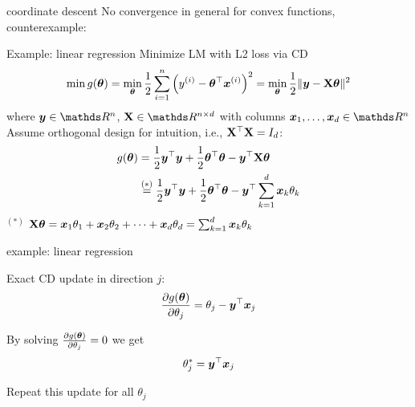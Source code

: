 \documentclass[11pt,compress,t,notes=noshow, xcolor=table]{beamer}
\begin{document}
\begin{framev}{coordinate descent}
No convergence in general for convex functions, counterexample:
\end{framev}


\begin{framev}{Example: linear regression}
Minimize LM with L2 loss via CD
$$\min g(\bm{\theta}) = \min_{\bm{\theta}} \frac{1}{2}\sum\limits_{i=1}^n \left(y^{(i)} - \bm{\theta}^\top \bm{x}^{(i)}\right)^2 = \min_{\bm{\theta}} \frac{1}{2}\|\bm{y} - \mathbf{X} \bm{\theta}\|^2 $$
where $\yv \in \R^n$, $\Xmat \in \R^{n \times d}$ with columns $\xv_1, \ldots, \xv_d \in \R^n$\\
\spacer
Assume orthogonal design for intuition, i.e., $\mathbf{X}^\top \mathbf{X} = I_d$:
\begin{align*}
g(\bm{\theta}) &= \frac{1}{2}\bm{y}^\top \bm{y} + \frac{1}{2}\bm{\theta}^\top \bm{\theta} - \bm{y}^\top \mathbf{X} \bm{\theta}  \\
&\overset{(*)}{=} \frac{1}{2}\bm{y}^\top \bm{y} + \frac{1}{2}\bm{\theta}^\top \bm{\theta} - \bm{y}^\top \sum_{k = 1}^d \bm{x}_k \theta_k
\end{align*}
$^{(*)}$ $\mathbf{X} \bm{\theta} = \bm{x}_1 \theta_1 + \bm{x}_2 \theta_2 + \cdots + \bm{x}_d \theta_d = \sum_{k = 1}^d \bm{x}_k \theta_k$
\end{framev}


\begin{framei}{example: linear regression}
\item Exact CD update in direction $j$:
$$\frac{\partial{g}(\bm{\theta})}{\partial \theta_j} = \theta_j - \bm{y}^\top \bm{x}_j$$
\item By solving $\frac{\partial{g}(\bm{\theta})}{\partial \theta_j} = 0$ we get $$\theta_j^\ast = \bm{y}^\top \bm{x}_j$$
\item Repeat this update for all $\theta_j$
\end{framei}
\end{document}
